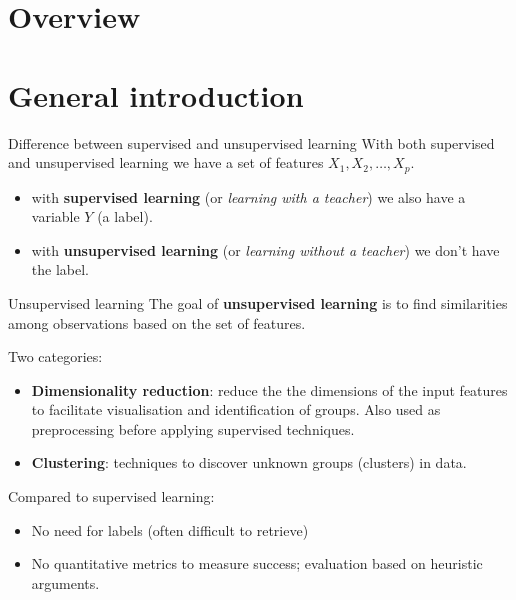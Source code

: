 \documentclass[notes]{beamer}          %
\begin{document}
\section{Overview}




\section{General introduction}
\begin{frame}{Difference between supervised and unsupervised learning}
With both supervised and unsupervised learning we have a set of features $X_1, X_2, \dots, X_p$.

\vspace{5mm} 

\begin{itemize}
\item with \textbf{supervised learning} (or \textit{learning with a teacher}) we also have a variable $Y$ (a label).
\item with \textbf{unsupervised learning} (or \textit{learning without a teacher}) we don't have the label.
\end{itemize}

\end{frame}


\begin{frame}{Unsupervised learning}
The goal of \textbf{unsupervised learning} is to find similarities among observations based on the set of features.

\vspace{2mm} 

Two categories:
\begin{itemize}
   \item \textbf{Dimensionality reduction}: reduce the the dimensions of the input features to facilitate visualisation and identification of groups. Also used as preprocessing before applying supervised techniques.
   \item \textbf{Clustering}: techniques to discover unknown groups (clusters) in data.
\end{itemize}

\vspace{2mm} 

Compared to supervised learning:
\begin{itemize}
\item No need for labels (often difficult to retrieve)
\item No quantitative metrics to measure success; evaluation based on heuristic arguments.
\end{itemize}

\end{frame}
\end{document}
